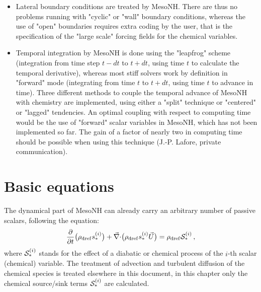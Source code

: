 \begin{itemize}
\begin{itemize}
    \item Lateral boundary conditions are treated by MesoNH.
        There are thus no problems
        running with "cyclic" or "wall" boundary conditions, whereas
        the use of "open" boundaries requires extra coding by the user,
        that is the specification of the "large scale" forcing fields
        for the chemical variables.
    \item Temporal integration by MesoNH is done using the "leapfrog" scheme
        (integration from time step $t-dt$ to $t+dt$, using time $t$
        to calculate the temporal derivative),
        whereas most stiff solvers work by definition in "forward" mode
        (integrating from time $t$ to $t+dt$,
        using time $t$ to advance in time).
        Three different methods to couple the temporal advance of
        MesoNH with chemistry are implemented, using either a "split"
        technique or "centered" or "lagged" tendencies.
        An optimal coupling with respect to computing time would be
        the use of "forward" scalar variables in MesoNH, which has not been
        implemented so far. The gain of a factor of nearly
        two in computing time should be possible when using this technique
        (J.-P. Lafore, private communication).
  \end{itemize}
\end{itemize}
\section{Basic equations}
%
The dynamical part of MesoNH
can already carry an arbitrary number of passive scalars,
following the equation:
%
\begin{equation}
\frac{\partial}{\partial t} \big(\rho_{\rm dref} {s}_\ast^{(i)}\big) + {\vec\nabla\cdot} \big(\rho_{\rm dref} {s}_\ast^{(i)} \vec U \big)
= \rho_{\rm dref} {\cal S}_\ast^{(i)}
\,,
\label{basic1}
\end{equation}
%
where ${\cal S}_\ast^{(i)}$  stands for the effect of a diabatic or chemical process 
of the $i$-th scalar (chemical) variable.
The treatment of advection and turbulent diffusion of the chemical
species is treated elsewhere in this document,
in this chapter only the chemical source/sink terms ${\cal S}_\ast^{(i)}$ are calculated.

